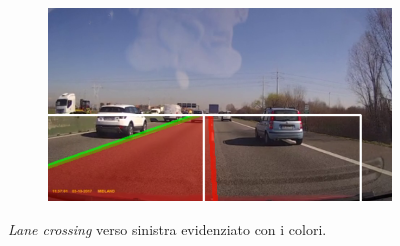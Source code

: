 \documentclass[12pt]{article}
\begin{document}
\begin{figure}[htbp]
\begin{subfigure}[b]{0.24\textwidth}
    \end{subfigure}
    \begin{subfigure}[b]{0.24\textwidth}
        \includegraphics[width=\textwidth]{cross_4.png}
    \end{subfigure}
\caption{\textit{Lane crossing} verso sinistra evidenziato con i colori.}
\end{figure}
\end{document}
